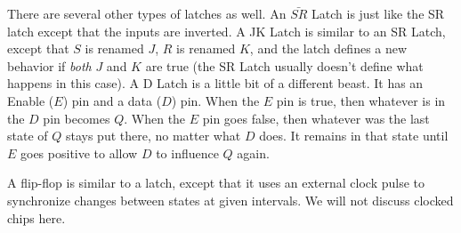 
There are several other types of latches as well.
An $\bar{SR}$ Latch is just like the SR latch except that the inputs are inverted.
A JK Latch is similar to an SR Latch, except that $S$ is renamed $J$, $R$ is renamed $K$, and the latch defines a new behavior if \emph{both} $J$ and $K$ are true (the SR Latch usually doesn't define what happens in this case).
A D Latch is a little bit of a different beast.
It has an Enable ($E$) pin and a data ($D$) pin.
When the $E$ pin is true, then whatever is in the $D$ pin becomes $Q$.
When the $E$ pin goes false, then whatever was the last state of $Q$ stays put there, no matter what $D$ does.
It remains in that state until $E$ goes positive to allow $D$ to influence $Q$ again.

A flip-flop is similar to a latch, except that it uses an external clock pulse to synchronize changes between states at given intervals.  
We will not discuss clocked chips here. 


